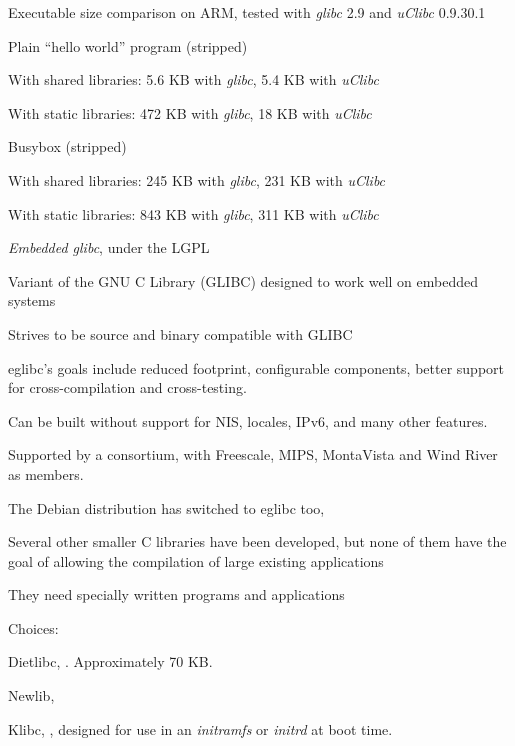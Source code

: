   \startitemize
  \item Executable size comparison on ARM, tested with {\em glibc}
    2.9 and {\em uClibc} 0.9.30.1
  \item Plain ``hello world'' program (stripped)
    \startitemize
    \item With shared libraries: 5.6 KB with {\em glibc}, 5.4 KB with
      {\em uClibc}
    \item With static libraries: 472 KB with {\em glibc}, 18 KB with
      {\em uClibc}
    \stopitemize
  \item Busybox (stripped)
    \startitemize
    \item With shared libraries: 245 KB with {\em glibc}, 231 KB with
      {\em uClibc}
    \item With static libraries: 843 KB with {\em glibc}, 311 KB with
      {\em uClibc}
    \stopitemize
  \stopitemize

    \startitemize
    \item {\em Embedded glibc}, under the LGPL
    \item Variant of the GNU C Library (GLIBC) designed to work well on
      embedded systems
    \item Strives to be source and binary compatible with GLIBC
    \item eglibc's goals include reduced footprint, configurable
      components, better support for cross-compilation and
      cross-testing.
    \item Can be built without support for NIS, locales, IPv6, and many
      other features.
    \item Supported by a consortium, with Freescale, MIPS, MontaVista
      and Wind River as members.
    \item The Debian distribution has switched to eglibc too,
    \item {}
    \stopitemize


  \startitemize
  \item Several other smaller C libraries have been developed, but
    none of them have the goal of allowing the compilation of large
    existing applications
  \item They need specially written programs and applications
  \item Choices:
    \startitemize
    \item Dietlibc, . Approximately
      70 KB.
    \item Newlib, 
    \item Klibc, ,
      designed for use in an {\em initramfs} or {\em initrd} at boot
      time.
    \stopitemize
  \stopitemize
